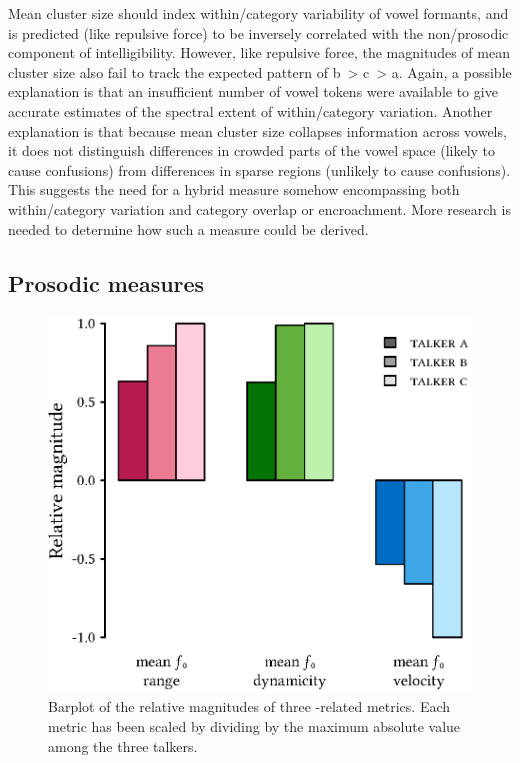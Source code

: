 Mean cluster size should index within\-/category variability of vowel formants, and is predicted (like repulsive force) to be inversely correlated with the non\-/prosodic component of intelligibility.  However, like repulsive force, the magnitudes of mean cluster size also fail to track the expected pattern of \ac{b}~> \ac{c}~> \ac{a}.  Again, a possible explanation is that an insufficient number of vowel tokens were available to give accurate estimates of the spectral extent of within\-/category variation.  Another explanation is that because mean cluster size collapses information across vowels, it does not distinguish differences in crowded parts of the vowel space (likely to cause confusions) from differences in sparse regions (unlikely to cause confusions).  This suggests the need for a hybrid measure somehow encompassing both within\-/category variation and category overlap or encroachment.  More research is needed to determine how such a measure could be derived.

\subsection{Prosodic measures}
\begin{figure}[bt]
	\begin{centering}
	\includegraphics{figures/posthocs/ProsodicMeasuresPitchOnly.eps}
	\caption[Barplot of \fo{} metrics]{Barplot of the relative magnitudes of three \fo-related metrics.  Each metric has been scaled by dividing by the maximum absolute value among the three talkers.\label{fig:ProsodicMeasuresPitch}}
	\end{centering}
\end{figure}

